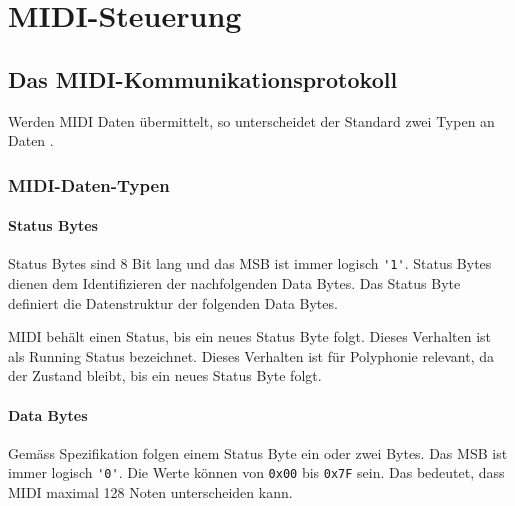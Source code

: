 
\chapter{MIDI-Steuerung}\label{chap.midi}

\section{Das MIDI-Kommunikationsprotokoll}\label{sect.midi_spezification}

Werden MIDI Daten übermittelt, so unterscheidet der Standard zwei Typen an Daten \citep{Midi_specification}.

\subsection{MIDI-Daten-Typen}\label{datentypen}

\subsubsection*{Status Bytes}

Status Bytes sind 8 Bit lang und das MSB ist immer logisch \lstinline|'1'|. Status Bytes dienen dem Identifizieren der nachfolgenden Data Bytes. Das Status Byte definiert die Datenstruktur der folgenden Data Bytes.

MIDI behält einen Status, bis ein neues Status Byte folgt. Dieses Verhalten ist als Running Status bezeichnet. Dieses Verhalten ist für Polyphonie relevant, da der Zustand bleibt, bis ein neues Status Byte folgt.

\subsubsection*{Data Bytes}

Gemäss Spezifikation folgen einem Status Byte ein oder zwei Bytes. Das MSB ist immer logisch \lstinline|'0'|. Die Werte können von \lstinline|0x00| bis \lstinline|0x7F| sein. Das bedeutet, dass MIDI maximal 128 Noten unterscheiden kann.

